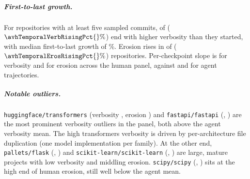 \subparagraph{First-to-last growth.} For repositories with at least five sampled commits, \avhTemporalVerbRising{} of \avhTemporalVerbTotal{} ($\avhTemporalVerbRisingPct{}\%$) end with higher verbosity than they started, with median first-to-last growth of \avhTemporalVerbGrowthMedian{}\%. Erosion rises in \avhTemporalErosRising{} of \avhTemporalErosTotal{} ($\avhTemporalErosRisingPct{}\%$) repositories. Per-checkpoint slope is \avhHumanVerbSlopeMedian{} for verbosity and \avhHumanErosSlopeMedian{} for erosion across the human panel, against \avhAgentVerbSlopeMedian{} and \avhAgentErosSlopeMedian{} for agent trajectories.

\subparagraph{Notable outliers.} \texttt{huggingface/transformers} (verbosity \avhTransformersVerb{}, erosion \avhTransformersErosion{}) and \texttt{fastapi/fastapi} (\avhFastapiVerb{}, \avhFastapiErosion{}) are the most prominent verbosity outliers in the panel, both above the agent verbosity mean. The high transformers verbosity is driven by per-architecture file duplication (one model implementation per family). At the other end, \texttt{pallets/flask} (\avhFlaskVerb{}, \avhFlaskErosion{}) and \texttt{scikit-learn/scikit-learn} (\avhSklearnVerb{}, \avhSklearnErosion{}) are large, mature projects with low verbosity and middling erosion. \texttt{scipy/scipy} (\avhScipyVerb{}, \avhScipyErosion{}) sits at the high end of human erosion, still well below the agent mean.
